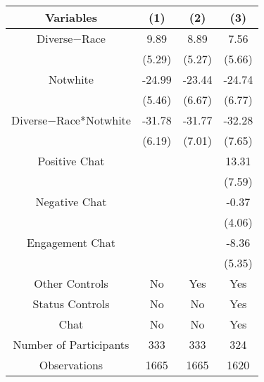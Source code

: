 \begin{table}[htbp]
\begin{left}
    
    \begin{tabular}{c c c c}
    \toprule
    \textbf{Variables} & \textbf{(1)} & \textbf{(2)} & \textbf{(3)}      \\ 
\midrule
Diverse$-$Race        &     9.89\sym{*}    &    8.89\sym{*}                   &  7.56 \\
                            &     (5.29)          &     (5.27)                &  (5.66) \\
Notwhite                  &      -24.99\sym{***}  &    -23.44\sym{***}      &  -24.74\sym{***}     \\
                            &      (5.46)         &    (6.67)          &  (6.77) \\
Diverse$-$Race*Notwhite    &      -31.78\sym{***}   &  -31.77\sym{***}      &  -32.28\sym{***}\\
                            &      (6.19)         &    (7.01)              &  (7.65) \\

Positive Chat                        &                     &                       &  13.31\sym{***}  \\
                                 &                     &                           &  (7.59)  \\
Negative  Chat                       &                     &                       &  -0.37  \\
                                 &                     &                           &  (4.06)  \\
Engagement Chat                      &                     &                       &  -8.36  \\
                                 &                     &                           &  (5.35)  \\
\midrule
Other Controls                   &    No               &    Yes                    &    Yes        \\
Status Controls                    &    No               &    No                   &    Yes        \\
Chat                             &    No               &    No                     &    Yes        \\
\midrule
Number of Participants           &    333               &    333                   &    324        \\
\midrule
Observations                     &       1665          &       1665                &  1620    \\
\bottomrule


\end{tabular}
\end{left}
\end{table}
